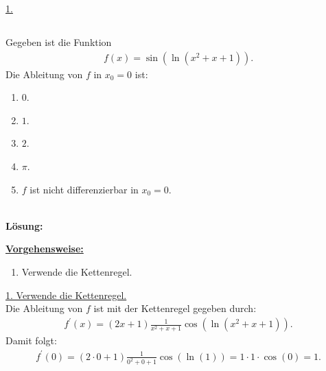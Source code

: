\underline{1. }\\



\newpage
\subsection*{}
Gegeben ist die Funktion
\begin{align*}
	f(x) = \sin(\ln(x^2 + x + 1)).
\end{align*}
Die Ableitung von $f$ in $x_0 = 0 $ ist:
\renewcommand{\labelenumi}{(\alph{enumi})}
\begin{enumerate}
	\item 
	$ 0$.
	\item
	$ 1 $.
	\item
	$ 2 $.
	\item
	$ \pi $.
	\item
	$f$ ist nicht differenzierbar in $x_0 = 0$.
\end{enumerate}
\ \\
\textbf{Lösung:}
\begin{mdframed}
\underline{\textbf{Vorgehensweise:}}
\renewcommand{\labelenumi}{\theenumi.}
\begin{enumerate}
\item Verwende die Kettenregel.
\end{enumerate}
\end{mdframed}
\underline{1. Verwende die Kettenregel.}\\
Die Ableitung von $f$ ist mit der Kettenregel gegeben durch:
\begin{align*}
	f^\prime(x) = (2x +1) \frac{1}{x^2 +x +1 } \cos (\ln(x^2 + x +1)).
\end{align*}
Damit folgt:
\begin{align*}
	f^\prime(0)  =(2\cdot 0 +1 ) \frac{1}{0^2 + 0 +1} \cos(\ln(1))
	= 1 \cdot 1 \cdot \cos(0) = 1.
\end{align*}

\newpage
